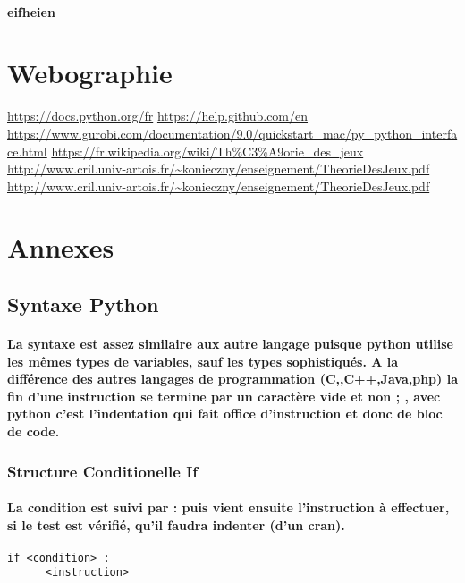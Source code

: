 \documentclass[a4paper, 12pt, twoside]{article}
\begin{document}
\paragraph{eifheien}




\newpage
\section{Webographie}
\begin{thebibliography}{2}
    \url{https://docs.python.org/fr}\newline
      \url{https://help.github.com/en}\newline
         \url{https://www.gurobi.com/documentation/9.0/quickstart_mac/py_python_interface.html}\newline
   \url{https://fr.wikipedia.org/wiki/Th\%C3\%A9orie_des_jeux}\newline
   \url{http://www.cril.univ-artois.fr/~konieczny/enseignement/TheorieDesJeux.pdf}\newline
   \url{http://www.cril.univ-artois.fr/~konieczny/enseignement/TheorieDesJeux.pdf}\newline
\end{thebibliography}

\newpage
\section{Annexes}
\subsection{Syntaxe Python}
\paragraph{La syntaxe est assez similaire aux autre langage puisque python utilise les mêmes types de variables, sauf les types sophistiqués. A la différence des autres langages de programmation (C,,C++,Java,php) la fin d'une instruction se termine par un caractère vide
et non  ; , avec python c'est l'indentation qui fait office d'instruction et donc de bloc de code.}
\subsubsection{ Structure Conditionelle If }
\paragraph{La condition est suivi par  :  puis vient ensuite l'instruction à effectuer, si le test est vérifié, qu'il faudra indenter (d'un cran).}
\begin{verbatim}
if <condition> :
      <instruction>
\end{verbatim}
\end{document}
